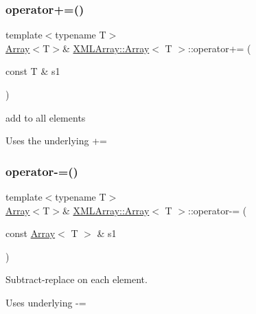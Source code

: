 \subsubsection{\texorpdfstring{operator+=()}{operator+=()}\hspace{0.1cm}{\footnotesize\ttfamily [6/6]}}
{\footnotesize\ttfamily template$<$typename T$>$ \\
\mbox{\hyperlink{classXMLArray_1_1Array}{Array}}$<$T$>$\& \mbox{\hyperlink{classXMLArray_1_1Array}{X\+M\+L\+Array\+::\+Array}}$<$ T $>$\+::operator+= (\begin{DoxyParamCaption}\item[{const T \&}]{s1 }\end{DoxyParamCaption})\hspace{0.3cm}{\ttfamily [inline]}}



add to all elements 

Uses the underlying += \mbox{\label{classXMLArray_1_1Array_aa92c6d59ed6a656c3004db85bd67c192}} 
\subsubsection{\texorpdfstring{operator-\/=()}{operator-=()}\hspace{0.1cm}{\footnotesize\ttfamily [1/6]}}
{\footnotesize\ttfamily template$<$typename T$>$ \\
\mbox{\hyperlink{classXMLArray_1_1Array}{Array}}$<$T$>$\& \mbox{\hyperlink{classXMLArray_1_1Array}{X\+M\+L\+Array\+::\+Array}}$<$ T $>$\+::operator-\/= (\begin{DoxyParamCaption}\item[{const \mbox{\hyperlink{classXMLArray_1_1Array}{Array}}$<$ T $>$ \&}]{s1 }\end{DoxyParamCaption})\hspace{0.3cm}{\ttfamily [inline]}}



Subtract-\/replace on each element. 

Uses underlying -\/= \mbox{\label{classXMLArray_1_1Array_aa92c6d59ed6a656c3004db85bd67c192}} 
